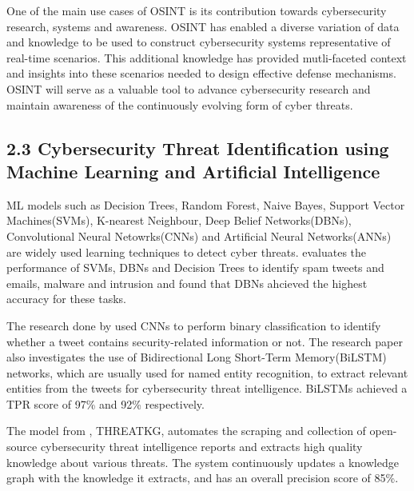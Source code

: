 \documentclass[letterpaper,twocolumn,fleqn]{article}
\begin{document}
One of the main use cases of OSINT is its contribution towards cybersecurity research, systems and awareness\cite{pastor-galindoNotExploitedGoldmine2020,vacasDetectingNetworkThreats2018}. 
OSINT has enabled a diverse variation of data and knowledge to be used to construct cybersecurity systems representative of real-time scenarios\cite{pastor-galindoNotExploitedGoldmine2020}. This additional knowledge has provided mutli-faceted context and insights into these scenarios needed to design effective defense mechanisms\cite{pastor-galindoNotExploitedGoldmine2020}.
OSINT will serve as a valuable tool to advance cybersecurity research and maintain awareness of the continuously evolving form of cyber threats\cite{jang-jaccardSurveyEmergingThreats2014}.

\subsection{2.3 Cybersecurity Threat Identification using Machine Learning and Artificial Intelligence}
ML models such as Decision Trees, Random Forest, Naive Bayes, Support Vector Machines(SVMs), K-nearest Neighbour, Deep Belief Networks(DBNs), Convolutional Neural Netowrks(CNNs) and Artificial Neural Networks(ANNs) are widely used learning techniques to detect cyber threats\cite{shaukatCyberThreatDetection2020,jainSpamDetectionSocial2018,ecolenationalesuperieuredesminesdeparisfranceInterpretableIdentificationCybersecurity2021,dionisioCyberthreatDetectionTwitter2019,chenPerformanceEvaluationMachine2015,al-yaseenRealtimeMultiagentSystem2017}. 
\cite{shaukatCyberThreatDetection2020} evaluates the performance of SVMs, DBNs and Decision Trees to identify spam tweets and emails, malware and intrusion and found that DBNs ahcieved the highest accuracy for these tasks. 

The research done by \cite{dionisioCyberthreatDetectionTwitter2019} used CNNs to perform binary classification to identify whether a tweet contains security-related information or not.
The research paper \cite{dionisioCyberthreatDetectionTwitter2019} also investigates the use of Bidirectional Long Short-Term Memory(BiLSTM) networks, which are usually used for named entity recognition, to extract relevant entities from the tweets for cybersecurity threat intelligence. BiLSTMs achieved a TPR score of 97\% and 92\% respectively\cite{dionisioCyberthreatDetectionTwitter2019}. 

The model from \cite{gaoThreatKGAIPoweredSystem2024}, THREATKG, automates the scraping and collection of open-source cybersecurity threat intelligence reports and extracts high quality knowledge about various threats. The system continuously updates a knowledge graph with the knowledge it extracts, and has an overall precision score of 85\%\cite{gaoThreatKGAIPoweredSystem2024}. 
\end{document}
